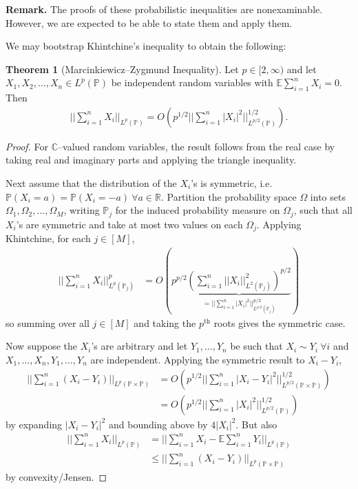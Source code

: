 \documentclass{article}
\theoremstyle{definition}
\newtheorem{theorem}{Theorem}[section]
\begin{document}
\textbf{Remark.} The proofs of these probabilistic inequalities are nonexaminable. However, we are expected to be able to state them and apply them.  
\vspace{1mm}
 
We may bootstrap Khintchine's inequality to obtain the following:
\begin{theorem}[Marcinkiewicz--Zygmund Inequality]
    Let $p \in [2,\infty)$ and let $X_1,X_2,\ldots,X_n \in L^p(\mathbb{P})$ be independent random variables with $\mathbb{E}\sum_{i=1}^{n} X_i = 0$. Then 
    \begin{align*}
        ||\sum_{i=1}^{n} X_i||_{L^p(\mathbb{P})} = O \left(p^{1/2}||\sum_{i=1}^{n} \left|X_i\right|^2||_{L^{p/2}(\mathbb{P})}^{1/2}\right).
    \end{align*}
\end{theorem}
\begin{proof}
    For $\mathbb{C}$--valued random variables, the result follows from the real case by taking real and imaginary parts and applying the triangle inequality. 
    \vspace{1mm}
     
    Next assume that the distribution of the $X_i$'s is symmetric, i.e. $\mathbb{P}\left(X_i=a\right)=\mathbb{P}\left(X_i=-a\right) ~\forall a \in \mathbb{R}$. Partition the probability space $\Omega$ into sets $\Omega_1,\Omega_2,\ldots,\Omega_M$, writing $\mathbb{P}_j$ for the induced probability measure on $\Omega_j$, such that all $X_i$'s are symmetric and take at most two values on each $\Omega_j$. Applying Khintchine, for each $j \in [M]$, 
    \begin{align*}
        ||\sum_{i=1}^{n} X_i||_{L^p(\mathbb{P}_j)}^{p} &= O (p^{p/2} \underbrace{\left(\sum_{i=1}^{n} ||X_i||^2_{L^2(\mathbb{P}_j)}\right)^{p/2}}_{= ||\sum_{i=1}^{n} \left|X_i\right|^2 ||_{L^{p/2}(\mathbb{P}_j)}^{p/2}})
    \end{align*}
    so summing over all $j \in [M]$ and taking the $p^{\text{th}}$ roots gives the symmetric case.

    \vspace{1mm}
     
    Now suppose the $X_i$'s are arbitrary and let $Y_1,\ldots,Y_n$ be such that $X_i \sim Y_i ~\forall i$ and $X_1,\ldots,X_n,Y_1,\ldots,Y_n$ are independent. Applying the symmetric result to $X_i-Y_i$,
    \begin{align*}
        ||\sum_{i=1}^{n} (X_i-Y_i)||_{L^p(\mathbb{P} \times \mathbb{P})} &= O \left(p^{1/2} ||\sum_{i=1}^{n} \left|X_i-Y_i\right|^2||_{L^{p/2}(\mathbb{P} \times \mathbb{P})}^{1/2}\right) \\
        &= O \left(p^{1/2} ||\sum_{i=1}^{n} \left|X_i\right|^2||_{L^{p/2}(\mathbb{P})}^{1/2} \right)
    \end{align*}
    by expanding $\left|X_i-Y_i\right|^2$ and bounding above by $4\left|X_i\right|^2$. But also 
    \begin{align*}
        ||\sum_{i=1}^{n} X_i||_{L^p(\mathbb{P})} &= ||\sum_{i=1}^{n} X_i - \mathbb{E} \sum_{i=1}^{n} Y_i||_{L^p(\mathbb{P})} \\
        &\le ||\sum_{i=1}^{n} (X_i-Y_i)||_{L^p(\mathbb{P} \times \mathbb{P})}
    \end{align*}
    by convexity/Jensen.
\end{proof}
\end{document}
